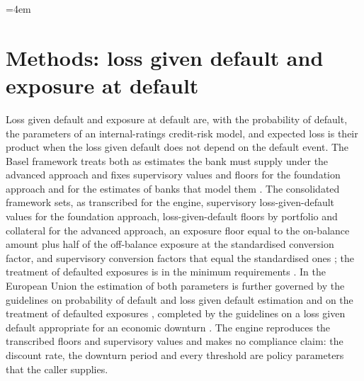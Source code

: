 
\emergencystretch=4em

\section{Methods: loss given default and exposure at default}
\label{sec:lgd-ead}

Loss given default and exposure at default are, with the probability of default, the parameters of an internal-ratings credit-risk model, and expected loss is their product when the loss given default does not depend on the default event. The Basel framework treats both as estimates the bank must supply under the advanced approach and fixes supervisory values and floors for the foundation approach and for the estimates of banks that model them \citep{lgd-ead:cre32}. The consolidated framework sets, as transcribed for the engine, supervisory loss-given-default values for the foundation approach, loss-given-default floors by portfolio and collateral for the advanced approach, an exposure floor equal to the on-balance amount plus half of the off-balance exposure at the standardised conversion factor, and supervisory conversion factors that equal the standardised ones \citep{lgd-ead:cre32,lgd-ead:cre20}; the treatment of defaulted exposures is in the minimum requirements \citep{lgd-ead:cre36}. In the European Union the estimation of both parameters is further governed by the guidelines on probability of default and loss given default estimation and on the treatment of defaulted exposures \citep{lgd-ead:eba2017}, completed by the guidelines on a loss given default appropriate for an economic downturn \citep{lgd-ead:eba2019}. The engine reproduces the transcribed floors and supervisory values and makes no compliance claim: the discount rate, the downturn period and every threshold are policy parameters that the caller supplies.

